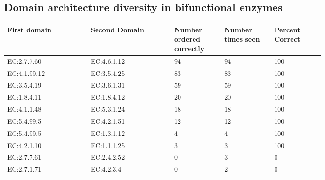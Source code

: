 \subsection*{Domain architecture diversity in bifunctional enzymes}
\begin{table}[htbp]
  \begin{tabular}{|p{0.2\linewidth}|p{0.2\linewidth}|p{0.12\linewidth}|p{0.12\linewidth}|p{0.12\linewidth}|}
  \hline
  First domain & Second Domain & Number ordered correctly & Number times seen & Percent Correct \\
  \hline
  EC:2.7.7.60  & EC:4.6.1.12   & 94                                           & 94                                       & 100                                 \\
  \hline
  EC:4.1.99.12 & EC:3.5.4.25   & 83                                           & 83                                       & 100                                 \\
  \hline
  EC:3.5.4.19  & EC:3.6.1.31   & 59                                           & 59                                       & 100                                 \\
  \hline
  EC:1.8.4.11  & EC:1.8.4.12   & 20                                           & 20                                       & 100                                 \\
  \hline
  EC:4.1.1.48  & EC:5.3.1.24   & 18                                           & 18                                       & 100                                 \\
  \hline
  EC:5.4.99.5  & EC:4.2.1.51   & 12                                           & 12                                       & 100                                 \\
  \hline
  EC:5.4.99.5  & EC:1.3.1.12   & 4                                            & 4                                        & 100                                 \\
  \hline
  EC:4.2.1.10  & EC:1.1.1.25   & 3                                            & 3                                        & 100                                 \\
  \hline
  EC:2.7.7.61  & EC:2.4.2.52   & 0                                            & 3                                        & 0                                   \\
  \hline
  EC:2.7.1.71  & EC:4.2.3.4    & 0                                            & 2                                        & 0                                   \\

\end{tabular}
\end{table}
